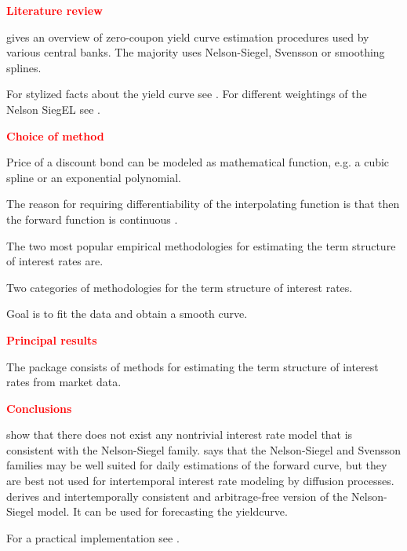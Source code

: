 \textcolor{red}{\textbf{Literature review}}

\cite{BIS2005, Bolder1999, Bliss1997, Soederlind1997, Ioannides2003, Diebold2006, Nawalkha2005}

\cite{BIS2005} gives an overview of zero-coupon yield curve estimation procedures used by various central banks. The majority uses Nelson-Siegel, Svensson or smoothing splines.

For stylized facts about the yield curve see \cite[p. 7]{Diebold2006}. For different weightings of the Nelson SiegEL see \cite{Soederlind1997, Bliss1997}.

\textcolor{red}{\textbf{Choice of method}}

\cite{Nelson1987, Svensson1994, McCulloch1975}

Price of a discount bond can be modeled as mathematical function, e.g. a cubic spline or an exponential polynomial.

The reason for requiring differentiability of the interpolating function is that then the forward function is continuous \citep[see][p. 97]{Hagan2006}.

The two most popular empirical methodologies for estimating the term structure of interest rates are.

Two categories of methodologies for the term structure of interest rates.

Goal is to fit the data and obtain a smooth curve.

\textcolor{red}{\textbf{Principal results}}

The  package  consists of methods for estimating the term structure of interest rates from market data.

\textcolor{red}{\textbf{Conclusions}}

\cite{Filipovic1999, Bjoerk1999} show that there does not exist any nontrivial interest rate model that is consistent with the Nelson-Siegel family. \cite{Filipovic2000} says that the Nelson-Siegel and Svensson families may be well suited for daily estimations of the forward curve, but they are best not used for intertemporal interest rate modeling by diffusion processes. \cite{Krippner2006} derives and intertemporally consistent and arbitrage-free version of the Nelson-Siegel model. It can be used for forecasting the yieldcurve.

For a practical implementation see \cite{Bolder2006}. 

